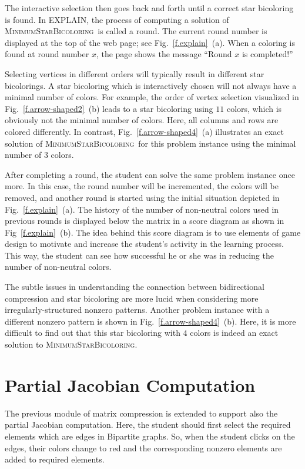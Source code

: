 \documentclass[12pt, oneside]{book}
\newcommand{\MinStaBic}{\textsc{MinimumStarBicoloring}}
\begin{document}
The interactive selection then goes back and forth until a correct star bicoloring is
found. In EXPLAIN, the process of computing a solution of \MinStaBic\ is called a round.
The current round number is displayed at the top of the web page; see
Fig.~\ref{f.explain}~(a). When a coloring is found at round number $x$, the page shows
the message ``Round $x$ is completed!''

Selecting vertices in different orders will typically result in different star
bicolorings. A star bicoloring which is interactively chosen will not always have a
minimal number of colors. For example, the order of vertex selection visualized in
Fig.~\ref{f.arrow-shaped2}~(b) leads to a star bicoloring using $11$ colors, which is
obviously not the minimal number of colors. Here, all columns and rows are colored
differently. In contrast, Fig.~\ref{f.arrow-shaped4}~(a) illustrates an exact solution of
\MinStaBic\ for this problem instance using the minimal number of $3$ colors.

After completing a round, the student can solve the same problem instance once more. In
this case, the round number will be incremented, the colors will be removed, and another
round is started using the initial situation depicted in Fig.~\ref{f.explain}~(a). The
history of the number of non-neutral colors used in previous rounds is displayed below
the matrix in a score diagram as shown in Fig~\ref{f.explain}~(b). The idea behind this
score diagram is to use elements of game design to motivate and increase the student's
activity in the learning process. This way, the student can see how successful he or she
was in reducing the number of non-neutral colors.

The subtle issues in understanding the connection between bidirectional compression and
star bicoloring are more lucid when considering more irregularly-structured nonzero
patterns. Another problem instance with a different nonzero pattern is shown in
Fig.~\ref{f.arrow-shaped4}~(b). Here, it is more difficult to find out that this star
bicoloring with $4$ colors is indeed an exact solution to \MinStaBic.

\section{Partial Jacobian Computation}
The previous module of matrix compression is extended to support
also the partial Jacobian computation. Here, the student should 
first select the required elements which are edges in Bipartite graphs.
So, when the student clicks on the edges, their colors change to red
and the corresponding nonzero elements are added to required elements.
\end{document}
